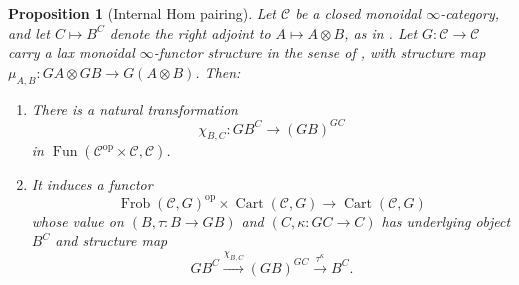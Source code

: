 \documentclass[11pt]{amsart}
\newcommand{\cC}{\mathcal{C}}
\newcommand{\Cart}{\operatorname{Cart}}
\newcommand{\op}{{\operatorname{op}}}
\DeclareMathOperator{\Fun}{\mathrm{Fun}}
\newcommand{\Frob}{\operatorname{Frob}}
\theoremstyle{plain}
\newtheorem{proposition}[proposition]{Proposition}
\theoremstyle{definition}
\numberwithin{equation}{section}
\begin{document}
\begin{proposition}[Internal Hom pairing]\label{prop:abstract-hom}
Let $\cC$ be a closed monoidal $\infty$-category, and let
$C\mapsto B^C$ denote the right adjoint to $A\mapsto A\otimes B$,
as in \cite[Definition 4.1.1.15; Remark 4.1.1.16]{HA}.
Let $G:\cC\to\cC$ carry a lax monoidal $\infty$-functor structure
in the sense of \cite[Definition 2.1.2.7; Example 2.2.6.10]{HA},
with structure map $\mu_{A,B}:GA\otimes GB\to G(A\otimes B)$.
Then:
\begin{enumerate}
\item
There is a natural transformation
\[
 \chi_{B,C}:G B^C\longrightarrow (GB)^{GC}
\]
in $\Fun(\cC^{\op}\times\cC,\cC)$.
\item
It induces a functor
\[
 \Frob(\cC,G)^{\op}\times\Cart(\cC,G)
       \longrightarrow\Cart(\cC,G)
\]
whose value on $(B,\tau:B\to GB)$ and $(C,\kappa:GC\to C)$
has underlying object $B^C$ and structure map
\begin{equation}\label{eq:abstract-hom-structure}
 G B^C\xrightarrow{\chi_{B,C}}(GB)^{GC}
                \xrightarrow{\tau^\kappa}B^C.
\end{equation}
\end{enumerate}
\end{proposition}
\end{document}
